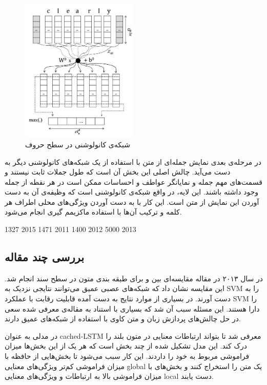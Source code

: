 \documentclass[12pt, a4paper, oneside]{report}
\begin{document}
\begin{figure}[h]
    \centering
    \includegraphics[width=0.5\textwidth]{CHARCNN}
    \caption{ شبکه‌ی کانولوشنی در سطح حروف }
    \label{fig:CHARCNN}
\end{figure}

در مرحله‌ی بعدی نمایش جمله‌ای از متن با استفاده از یک شبکه‌های کانولوشنی دیگر به دست می‌آید.
چالش اصلی این بخش آن است که طول جملات ثابت نیستند و قسمت‌های مهم جمله و نمایانگر عواطف و احساسات
ممکن است در هر نقطه از جمله وجود داشته باشند. این لایه، در واقع شبکه‌ی کانولوشنی است که وظیفه‌ی آن
به دست آوردن این نمایش از متن است. این کار با به دست آوردن ویژگی‌های محلی اطراف هر کلمه و ترکیب
آن‌ها با استفاده ماکزیمم گیری انجام می‌شود.



\cite{tang-etal-2015-document} 1327 2015
\cite{socher-etal-2011-semi} 1471 2011
\cite{socher-etal-2012-semantic} 1400 2012
\cite{socher-etal-2013-recursive} 5000 2013




\subsection{بررسی چند مقاله}

در سال ۲۰۱۳ در مقاله
\cite{Moraes2013DocumentlevelSC}
مقایسه‌ای بین
و
برای طبقه بندی متون در سطح سند انجام شد. این مقایسه نشان داد که شبکه‌‌های عصبی عمیق می‌توانند نتایجی نزدیک به
SVM
را به دست آورند. در بسیاری از موارد نتایج به دست آمده قابلیت رقابت با عملکرد‌
SVM
را دارا هستند. این مسئله سبب آن شد که بسیاری با استناد به مقاله‌ی معرفی شده سعی در حل چالش‌های پردازش زبان و متن کاوی
با استفاده از شبکه‌های عمیق دارند.

در
\cite{xu2016cached}
مدلی به عنوان
cached-LSTM
معرفی شد تا بتواند ارتباطات معنایی در متون بلند را درک کند. این مدل تشکیل شده از چند بخش است که هر یک از این
بخش‌ها میزان فراموشی مربوط به خود را داردند. این کار سبب می‌شود تا بخش‌هایی از حافظه با میزان فراموشی کم‌تر ویژگی‌های
معنایی
global
یک متن را استخراج کنند و بخش‌های با میزان فراموشی بالا به ارتباطات و ویژگی‌های معنایی
local
دست یابند.
\end{document}
